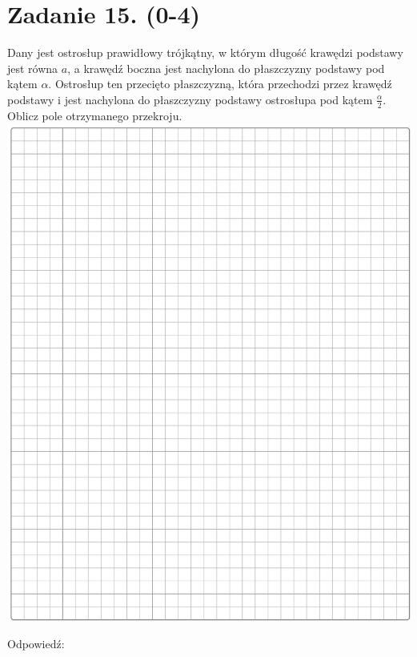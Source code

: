 \documentclass[10pt]{article}
\begin{document}
\section*{Zadanie 15. (0-4)}
Dany jest ostrosłup prawidłowy trójkątny, w którym długość krawędzi podstawy jest równa \(a\), a krawędź boczna jest nachylona do płaszczyzny podstawy pod kątem \(\alpha\). Ostrosłup ten przecięto płaszczyzną, która przechodzi przez krawędź podstawy i jest nachylona do płaszczyzny podstawy ostrosłupa pod kątem \(\frac{\alpha}{2}\). Oblicz pole otrzymanego przekroju.\\
\includegraphics[max width=\textwidth, center]{2024_11_21_06df787f12c5337a1fe8g-12}

Odpowiedź:
\end{document}
